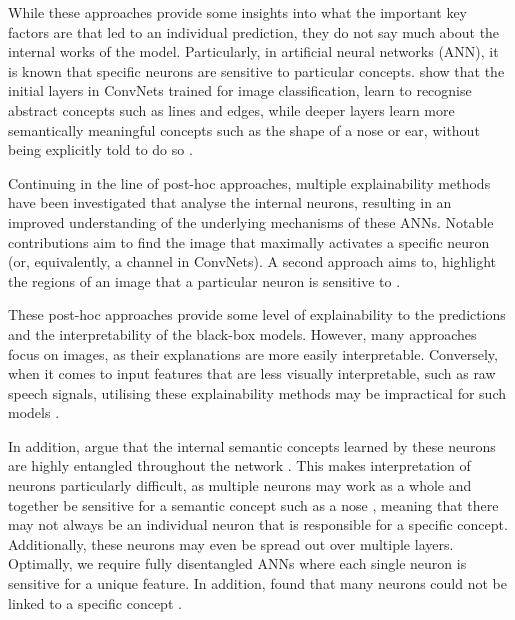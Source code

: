 While these approaches provide some insights into what the important key factors are that led to an individual prediction, they do not say much about the internal works of the model. Particularly, in artificial neural networks (ANN), it is known that specific neurons are sensitive to particular concepts. \citeauthor{zeilerVisualizingUnderstandingConvolutional2013} show that the initial layers in ConvNets trained for image classification, learn to recognise abstract concepts such as lines and edges, while deeper layers learn more semantically meaningful concepts such as the shape of a nose or ear, without being explicitly told to do so \citep{zeilerVisualizingUnderstandingConvolutional2013}.


Continuing in the line of post-hoc approaches, multiple explainability methods have been investigated that analyse the internal neurons, resulting in an improved understanding of the underlying mechanisms of these ANNs. Notable contributions aim to find the image that maximally activates a specific neuron \citep{simonyanDeepConvolutionalNetworks2014} (or, equivalently, a channel in ConvNets). A second approach aims to, highlight the regions of an image that a particular neuron is sensitive to \citep{zeilerVisualizingUnderstandingConvolutional2013}.

These post-hoc approaches provide some level of explainability to the predictions and the interpretability of the black-box models. However, many approaches focus on images, as their explanations are more easily interpretable. Conversely, when it comes to input features that are less visually interpretable, such as raw speech signals, utilising these explainability methods may be impractical for such models \citep{krugAnalyzingVisualizingDeep2021}.

In addition, \citeauthor{bauNetworkDissectionQuantifying2017} argue that the internal semantic concepts learned by these neurons are highly entangled throughout the network \cite{bauNetworkDissectionQuantifying2017}. This makes interpretation of neurons particularly difficult, as multiple neurons may work as a whole and together be sensitive for a semantic concept such as a nose \citep{molnarInterpretableMachineLearning2022}, meaning that there may not always be an individual neuron that is responsible for a specific concept. Additionally, these neurons may even be spread out over multiple layers.  Optimally, we require fully disentangled ANNs where each single neuron is sensitive for a unique feature. In addition, \citeauthor{bauNetworkDissectionQuantifying2017} found that many neurons could not be linked to a specific concept \citep{molnarInterpretableMachineLearning2022}.

